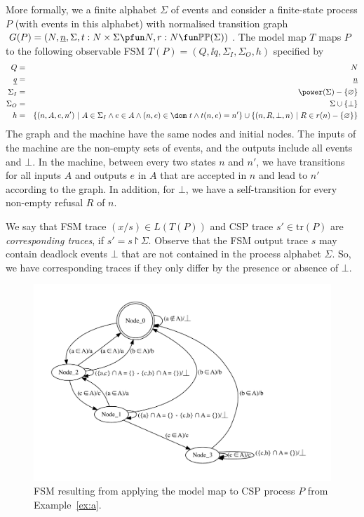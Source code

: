 More formally, we a finite alphabet $\Sigma$ of events and consider a
finite-state process $P$ (with events in this alphabet) with normalised
transition graph $G(P)=( N, \ii n, \Sigma, t : N\times\Sigma \pfun N, r : N
\fun \mathbb{P}\mathbb{P}(\Sigma))$. The model map $T$ maps $P$ to the
following observable FSM $T(P) = (Q,\ii q, \Sigma_I,\Sigma_O,h)$ specified by
%
\begin{eqnarray*}
  Q & = & N
  \\
  \ii q & = & \ii n
  \\
  \Sigma_I & = & \power(\Sigma) - \{ \varnothing \}
  \\
  \Sigma_O & = & \Sigma \cup \{ \bot\}
  \\
  h & = & \{ (n,A,e,n')~|~A\in \Sigma_I \wedge e\in A \wedge (n,e)\in \dom~t\wedge t(n,e) = n' \} \cup
  \{ (n,R,\bot,n)~|~R\in r(n) -\{\varnothing\} \}
\end{eqnarray*}
%
The graph and the machine have the same nodes and initial nodes. The inputs
of the machine are the non-empty sets of events, and the outputs include all
events and $\bot$. In the machine, between every two states $n$ and $n'$, we
have transitions for all inputs $A$ and outputs $e$ in $A$ that are accepted
in $n$ and lead to $n'$ according to the graph. In addition, for $\bot$, we
have a self-transition for every non-empty refusal $R$ of $n$.

We say that FSM trace $(x/s) \in L(T(P))$ and CSP trace $s'\in\text{tr}(P)$
are \emph{corresponding traces}, if $s' = s\project \Sigma$. Observe that the
FSM output trace $s$ may contain deadlock events $\bot$ that are not
contained in the  process alphabet $\Sigma$. So, we have corresponding traces
if they only differ by the presence or absence of $\bot$.

 \begin{figure}
 \begin{center}
\includegraphics[width=\textwidth]{fsm0.pdf}
\end{center}
\caption{FSM resulting from applying the model map to CSP process $P$ from Example~\ref{ex:a}.}
 \label{fig:fsm0}
 \end{figure}


